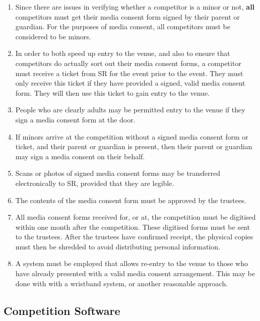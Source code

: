 \begin{enumerate}
\begin{enumerate}
  \item Since there are issues in verifying whether a competitor is a minor or not, \textbf{all} competitors must get their media consent form signed by their parent or guardian.  For the purposes of media consent, all competitors must be considered to be minors.

  \item In order to both speed up entry to the venue, and also to ensure that competitors do actually sort out their media consent forms, a competitor must receive a ticket from SR for the event prior to the event.  They must only receive this ticket if they have provided a signed, valid media consent form.  They will then use this ticket to gain entry to the venue.

  \item People who are clearly adults may be permitted entry to the venue if they sign a media consent form at the door.

  \item If minors arrive at the competition without a signed media consent form or ticket, and their parent or guardian is present, then their parent or guardian may sign a media consent on their behalf.

  \item Scans or photos of signed media consent forms may be transferred electronically to SR, provided that they are legible.

  \item The contents of the media consent form must be approved by the trustees.

  \item All media consent forms received for, or at, the competition must be digitised within one month after the competition.  These digitised forms must be sent to the trustees.  After the trustees have confirmed receipt, the physical copies must then be shredded to avoid distributing personal information.

  \item A system must be employed that allows re-entry to the venue to those who have already presented with a valid media consent arrangement.  This may be done with with a wristband system, or another reasonable approach.
  \end{enumerate}

\end{enumerate}


\subsection{Competition Software}

